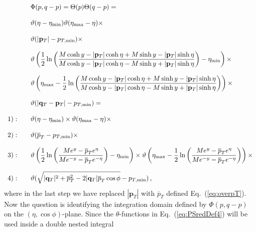 \documentclass[10pt,a4paper]{article}
\begin{document}
\begin{equation}\label{eq:intdomain}
\begin{array}{ll}
&\Phi(p,q-p) = \Theta(p) \Theta(q-p)=\\
\\
&\displaystyle 
\vartheta(\eta - \eta_{\rm min}) \vartheta(\eta_{\rm max}-\eta)
  \times\\
\\
&\displaystyle \vartheta(|\mathbf{p}_{T}| - p_{T,\rm min})\times\\
\\
&\displaystyle \vartheta\left(\frac12\ln\left(\frac{M\cosh y-|\mathbf{p}_T|\cosh\eta+M\sinh y-|\mathbf{p}_T|\sinh\eta}{M\cosh y-|\mathbf{p}_T|\cosh\eta-M\sinh y+|\mathbf{p}_T|\sinh\eta}\right)-\eta_{\rm min}\right)\times\\
\\
&\displaystyle \vartheta\left(\eta_{\rm
  max}-\frac12\ln\left(\frac{M\cosh y-|\mathbf{p}_T|\cosh\eta+M\sinh
  y-|\mathbf{p}_T|\sinh\eta}{M\cosh y-|\mathbf{p}_T|\cosh\eta-M\sinh
  y+|\mathbf{p}_T|\sinh\eta}\right)\right)\times\\
\\
&\vartheta(|\mathbf{q}_{T}-\mathbf{p}_{T}| - p_{T,\rm min})=\\
\\
1):\quad&\displaystyle \vartheta(\eta-\eta_{\rm min}) \times\vartheta(\eta_{\rm max}-\eta) \times\\
\\
2):\quad&\displaystyle \vartheta(\overline{p}_T - p_{T,\rm min})\times\\
\\
3):\quad&\displaystyle 
  \vartheta\left(\frac12\ln\left(\frac{Me^y-\overline{p}_Te^\eta}{Me^{-y}-\overline{p}_Te^{-
\eta}}\right)-\eta_{\rm min}\right)\times\vartheta\left(\eta_{\rm max}-\frac12\ln\left(\frac{Me^y-\overline{p}_Te^\eta}{Me^{-y}-\overline{p}_Te^{-
\eta}}\right)\right)\times\\
\\
4):\quad&\displaystyle \vartheta(\sqrt{|\mathbf{q}_T|^2+\overline{p}_T^2-2 |\mathbf{q}_T|\overline{p}_T\cos\phi} - p_{T,\rm min})\,,
\end{array}
\end{equation}
where in the last step we have replaced $|\mathbf{p}_T|$ with
$\overline{p}_T$ defined Eq.~(\ref{eq:overpT}). Now the question is
identifying the integration domain defined by $\Phi(p,q-p)$ on the
$(\eta,\cos\phi)$-plane. Since the $\theta$-functions in
Eq.~(\ref{eq:PSredDef4}) will be used inside a double nested integral
\end{document}
